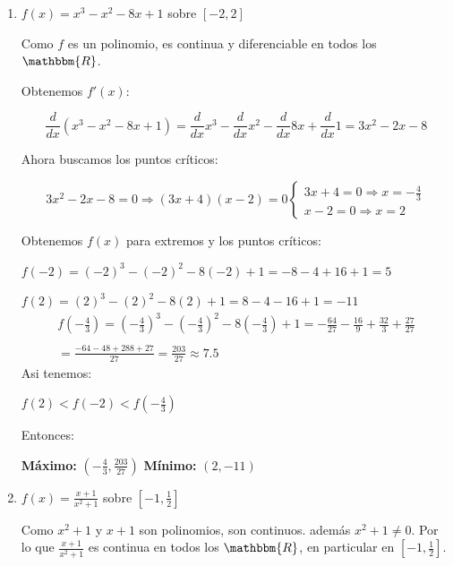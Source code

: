 \documentclass[12pt]{article}
\begin{document}
\begin{enumerate}[\hspace{9px} a)]
    \item \(f(x)=x^3-x^2-8x+1\) sobre $[-2,2]$\bigskip
    
        Como $f$ es un polinomio, es continua y diferenciable en todos los $\mathbbm{R}$.\medskip

        Obtenemos $f'(x)$:

        \[\displaystyle\frac{d}{dx}(x^3-x^2-8x+1) = \frac{d}{dx}x^3 - \frac{d}{dx}x^2 - \frac{d}{dx}8x + \frac{d}{dx}1 = 3x^2-2x-8\]\medskip

        Ahora buscamos los puntos cr\'iticos:

        \[3x^2-2x-8=0 \Rightarrow (3x+4)(x-2)=0
            \begin{cases}
                3x+4=0 \Rightarrow x=-\displaystyle\frac{4}{3}\\
                x-2=0 \Rightarrow x=2
            \end{cases}
        \]\medskip

        Obtenemos $f(x)$ para extremos y los puntos cr\'iticos:

        \(f(-2) = (-2)^3-(-2)^2-8(-2)+1 = -8-4+16+1 = 5\)

        \(f(2) = (2)^3-(2)^2-8(2)+1 = 8-4-16+1 = -11\)
        \begin{multline*}
            f\left(-\displaystyle\frac{4}{3}\right) = \left(-\frac{4}{3}\right)^3-\left(-\frac{4}{3}\right)^2-8\left(-\frac{4}{3}\right)+1 = -\frac{64}{27} -\frac{16}{9} + \frac{32}{3} +\frac{27}{27}\\ \\
            = \frac{-64-48+288+27}{27} = \frac{203}{27} \approx 7.5
        \end{multline*}
        Asi tenemos:

        \(f(2)<f(-2)<f(-\displaystyle\frac{4}{3})\)\bigskip

        Entonces:
        \begin{center}
            \textbf{M\'aximo: } $\left(-\displaystyle\frac{4}{3},\frac{203}{27}\right)$ \hspace{4em} \textbf{M\'inimo: } $(2,-11)$
        \end{center}
        

    \item \(f(x)=\displaystyle\frac{x+1}{x^2+1}\) sobre $\left[-1,\frac{1}{2}\right]$\bigskip
    
        Como $x^2+1$ y $x+1$ son polinomios, son continuos. adem\'as $x^2+1 \neq 0$. Por lo que \(\displaystyle\frac{x+1}{x^2+1}\) es continua en todos los $\mathbbm{R}$, en particular en $[-1,\frac{1}{2}]$.\medskip


\end{enumerate}
\end{document}
